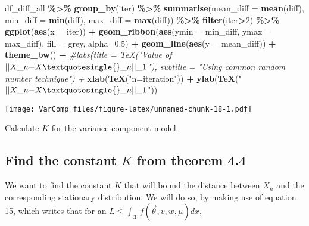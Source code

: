\documentclass[
]{article}
\newenvironment{Shaded}{\begin{snugshade}}{\end{snugshade}}
\newcommand{\AttributeTok}[1]{\textcolor[rgb]{0.13,0.29,0.53}{#1}}
\newcommand{\CommentTok}[1]{\textcolor[rgb]{0.56,0.35,0.01}{\textit{#1}}}
\newcommand{\DecValTok}[1]{\textcolor[rgb]{0.00,0.00,0.81}{#1}}
\newcommand{\FloatTok}[1]{\textcolor[rgb]{0.00,0.00,0.81}{#1}}
\newcommand{\FunctionTok}[1]{\textcolor[rgb]{0.13,0.29,0.53}{\textbf{#1}}}
\newcommand{\NormalTok}[1]{#1}
\newcommand{\SpecialCharTok}[1]{\textcolor[rgb]{0.81,0.36,0.00}{\textbf{#1}}}
\newcommand{\StringTok}[1]{\textcolor[rgb]{0.31,0.60,0.02}{#1}}
\begin{document}
\begin{Shaded}
\begin{Highlighting}[]
\NormalTok{df\_diff\_all }\SpecialCharTok{\%\textgreater{}\%}
  \FunctionTok{group\_by}\NormalTok{(iter) }\SpecialCharTok{\%\textgreater{}\%}
  \FunctionTok{summarise}\NormalTok{(}\AttributeTok{mean\_diff =} \FunctionTok{mean}\NormalTok{(diff), }\AttributeTok{min\_diff =}  \FunctionTok{min}\NormalTok{(diff), }\AttributeTok{max\_diff =} \FunctionTok{max}\NormalTok{(diff)) }\SpecialCharTok{\%\textgreater{}\%} 
  \FunctionTok{filter}\NormalTok{(iter}\SpecialCharTok{\textgreater{}}\DecValTok{2}\NormalTok{) }\SpecialCharTok{\%\textgreater{}\%}  
  \FunctionTok{ggplot}\NormalTok{(}\FunctionTok{aes}\NormalTok{(}\AttributeTok{x =}\NormalTok{ iter)) }\SpecialCharTok{+}
  \FunctionTok{geom\_ribbon}\NormalTok{(}\FunctionTok{aes}\NormalTok{(}\AttributeTok{ymin =}\NormalTok{ min\_diff, }\AttributeTok{ymax =}\NormalTok{ max\_diff), }\AttributeTok{fill =} \StringTok{\textquotesingle{}grey\textquotesingle{}}\NormalTok{, }\AttributeTok{alpha=}\FloatTok{0.5}\NormalTok{) }\SpecialCharTok{+}
  \FunctionTok{geom\_line}\NormalTok{(}\FunctionTok{aes}\NormalTok{(}\AttributeTok{y =}\NormalTok{ mean\_diff)) }\SpecialCharTok{+}
  \FunctionTok{theme\_bw}\NormalTok{() }\SpecialCharTok{+}
  \CommentTok{\#labs(title = TeX("Value of $||X\_n{-}X\textquotesingle{}\_n||\_1$"), subtitle = "Using common random number technique") +}
  \FunctionTok{xlab}\NormalTok{(}\FunctionTok{TeX}\NormalTok{(}\StringTok{"n=iteration"}\NormalTok{)) }\SpecialCharTok{+} \FunctionTok{ylab}\NormalTok{(}\FunctionTok{TeX}\NormalTok{(}\StringTok{"$||X\_n{-}X\textquotesingle{}\_n||\_1$"}\NormalTok{))}
\end{Highlighting}
\end{Shaded}

\texttt{[image: VarComp\_files/figure-latex/unnamed-chunk-18-1.pdf]}

Calculate \(K\) for the variance component model.

\subsection{\texorpdfstring{Find the constant \(K\) from theorem
4.4}{Find the constant K from theorem 4.4}}\label{find-the-constant-k-from-theorem-4.4}

We want to find the constant \(K\) that will bound the distance between
\(X_n\) and the corresponding stationary distribution. We will do so, by
making use of equation 15, which writes that for an
\(L\leq \int_{\mathcal{X}} f(\vec{\theta}, v, w, \mu) dx\),
\end{document}
